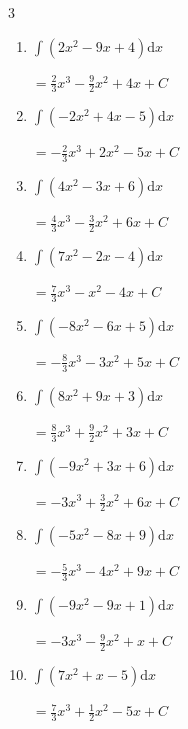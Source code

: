 \begin{multicols}{3}
\begin{enumerate}
  \item $\displaystyle \int \left( 2x^{2}-9x+4 \right) \mathrm{d}x$

        $\displaystyle =\frac{2}{3}x^{3}-\frac{9}{2}x^{2}+4x+ C$

  \item $\displaystyle \int \left( -2x^{2}+4x-5 \right) \mathrm{d}x$

        $\displaystyle =-\frac{2}{3}x^{3}+2x^{2}-5x+ C$

  \item $\displaystyle \int \left( 4x^{2}-3x+6 \right) \mathrm{d}x$

        $\displaystyle =\frac{4}{3}x^{3}-\frac{3}{2}x^{2}+6x+ C$

  \item $\displaystyle \int \left( 7x^{2}-2x-4 \right) \mathrm{d}x$

        $\displaystyle =\frac{7}{3}x^{3}-x^{2}-4x+ C$

  \item $\displaystyle \int \left( -8x^{2}-6x+5 \right) \mathrm{d}x$

        $\displaystyle =-\frac{8}{3}x^{3}-3x^{2}+5x+ C$

  \item $\displaystyle \int \left( 8x^{2}+9x+3 \right) \mathrm{d}x$

        $\displaystyle =\frac{8}{3}x^{3}+\frac{9}{2}x^{2}+3x+ C$

\columnbreak %

\resetques

  \item $\displaystyle \int \left( -9x^{2}+3x+6 \right) \mathrm{d}x$

        $\displaystyle =-3x^{3}+\frac{3}{2}x^{2}+6x+ C$

  \item $\displaystyle \int \left( -5x^{2}-8x+9 \right) \mathrm{d}x$

        $\displaystyle =-\frac{5}{3}x^{3}-4x^{2}+9x+ C$

  \item $\displaystyle \int \left( -9x^{2}-9x+1 \right) \mathrm{d}x$

        $\displaystyle =-3x^{3}-\frac{9}{2}x^{2}+x+ C$

  \item $\displaystyle \int \left( 7x^{2}+x-5 \right) \mathrm{d}x$

        $\displaystyle =\frac{7}{3}x^{3}+\frac{1}{2}x^{2}-5x+ C$


\end{enumerate}
\end{multicols}
